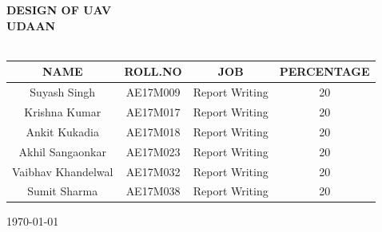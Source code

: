 \begin{titlepage}
	{\huge\bfseries DESIGN OF UAV}\\[0.4cm] %
	{\large\bfseries UDAAN}\\
	\HRule\\[1.5cm]
	
	
	
\begin{table}[h!]
 \begin{center}
 \begin{tabular}{|c| c |c |c|} 
 \hline
 NAME & ROLL.NO & JOB & PERCENTAGE \\ [0.5ex] 
 \hline
 Suyash Singh & AE17M009 & Report Writing & 20 \\ 
 \hline
  Krishna Kumar & AE17M017  & Report Writing & 20 \\
 \hline
 Ankit Kukadia & AE17M018  & Report Writing & 20 \\
 \hline
 Akhil Sangaonkar & AE17M023 & Report Writing & 20 \\ 
 \hline
 Vaibhav Khandelwal & AE17M032 & Report Writing & 20 \\ 
 \hline
 Sumit Sharma & AE17M038 & Report Writing & 20 \\ 
 \hline
\end{tabular}
\end{center}

\end{table}
	
	
	
	\vfill\vfill\vfill %
	
	{\large\today} %
	
	
	 
	
	\vfill %
	
\end{titlepage}




